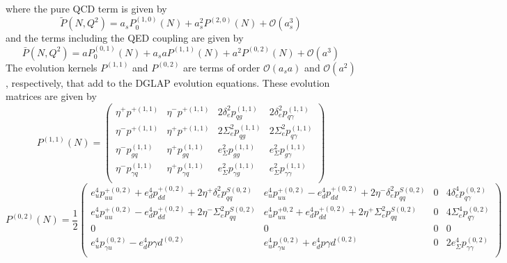 \documentclass[review]{elsarticle}
\begin{document}
where the pure QCD term is given by
\begin{equation}
\tilde{P}(N,Q^{2})=a_{s}P_{0}^{(1,0)}(N)+a_{s}^{2}P^{(2,0)}(N)+\mathcal{O}(a_{s}^{3})\label{eq:39}
\end{equation}
and the terms including the QED coupling are given by
\begin{equation}
\bar{P}(N,Q^{2})=a P_{0}^{(0,1)}(N)+a_{s} a P^{(1,1)}(N)+a^2 P^{(0,2)}(N)+\mathcal{O}(a^{3})\label{eq:40}
\end{equation}
The evolution kernels $P^{(1,1)}$ and $P^{(0,2)}$ are terms of order $\mathcal{O}(a_{s}a)$ and $\mathcal{O}(a^{2})$, respectively, that add to the DGLAP evolution equations. These evolution matrices are given by
\begin{equation}
P^{(1,1)}(N)=
\left(
\begin{array}{cccc}
\eta^+ p^{+(1,1)} & \eta^- p^{+(1,1)}& 2 \delta_e^2 p_{qg}^{(1,1)} & 2 \delta_e^2 p_{q\gamma}^{(1,1)} \\
\eta^- p^{+(1,1)}  & \eta^+ p^{+(1,1)}  & 2 \Sigma_e^2 p_{qg}^{(1,1)} & 2 \Sigma_e^2 p_{q\gamma}^{(1,1)} \\
 \eta^- p_{gq}^{(1,1)}  & \eta^+ p_{gq}^{(1,1)} & e_\Sigma^2 p_{gg}^{(1,1)} &
  e_\Sigma^2 p_{g\gamma}^{(1,1)} \\
 \eta^- p_{\gamma q}^{(1,1)}  & \eta^+ p_{\gamma q}^{(1,1)}  & e_\Sigma^2 p_{\gamma g}^{(1,1)} & e_\Sigma^2 p_{\gamma \gamma}^{(1,1)} \\
\end{array}
\right)
\label{eq:41}
\end{equation}
\begin{equation}
P^{(0,2)}(N)=\frac{1}{2} \left(
\begin{array}{cccc}
 e_u^4 p_{uu}^{+(0,2)}+ e_d^4 p_{dd}^{+(0,2)}+2 \eta^{+} \delta_e^2 p_{qq}^{S(0,2)} & e_u^4 p_{uu}^{+(0,2)}- e_d^4 p_{dd}^{+(0,2)}+2 \eta^{-} \delta_e^2 p_{qq}^{S(0,2)} & 0 & 4 \delta_e^4 p_{q \gamma}^{(0,2)}\\
 e_u^4 p_{uu}^{+(0,2)}- e_d^4 p_{dd}^{+(0,2)}+2 \eta^{-} \Sigma_e^2 p_{qq}^{S(0,2)} &  e_u^4 p_{uu}^{+{0,2}}+ e_d^4 p_{dd}^{+{(0,2)}}+2 \eta^{+} \Sigma_e^2 p_{qq}^{S(0,2)} & 0 & 4 \Sigma_e^4 p_{q \gamma}^{(0,2)}\\
 0 & 0 & 0 & 0 \\ e_u^4 p_{\gamma u}^{(0,2)}- e_d^4 p{\gamma d}^{(0,2)} & e_u^4 p_{\gamma u}^{(0,2)}+ e_d^4 p{\gamma d}^{(0,2)} & 0 & 2 e_\Sigma^4 p_{\gamma \gamma}^{(0,2)} \\
\end{array}
\right)
\label{eq:42}
\end{equation}
\end{document}
